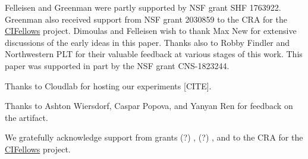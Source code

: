 
\begin{acks}
Felleisen and Greenman were partly supported by NSF grant SHF
1763922.
Greenman also received support from NSF grant 2030859 to the CRA for the
\href{https://cifellows2020.org}{CIFellows} project.
Dimoulas and Felleisen wish to thank Max New for
extensive discussions of the early ideas in this paper. Thanks also to
Robby Findler and Northwestern PLT for their valuable feedback at
various stages of this work.
This paper was supported in part by the NSF grant CNS-1823244.


  Thanks to Cloudlab for hosting our experiments [CITE].

  Thanks to Ashton Wiersdorf, Caspar Popova, and Yanyan Ren for feedback on the artifact.

We gratefully acknowledge support from
 grants
  (?) \href{"https://www.nsf.gov/awardsearch/showAward?AWD_ID=1763922"}{},
  (?) \href{"https://www.nsf.gov/awardsearch/showAward?AWD_ID=1823244"}{},
 and
 \href{"https://www.nsf.gov/awardsearch/showAward?AWD_ID=2030859"}{}
  to the CRA for the \href{https://cifellows2020.org}{CIFellows} project.

\end{acks}
